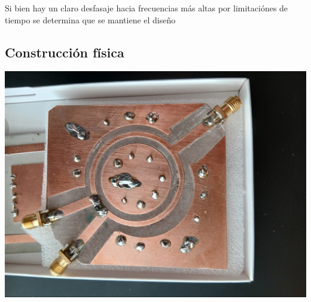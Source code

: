 \documentclass[a4paper, 12pt]{article}
\begin{document}
Si bien hay un claro desfasaje hacia frecuencias más altas por limitaciónes de tiempo se determina que se mantiene el diseño

\subsection{Construcción física}

\begin{center}
\includegraphics[width=0.7\linewidth]{./img/real.jpg}
\end{center}
\end{document}
